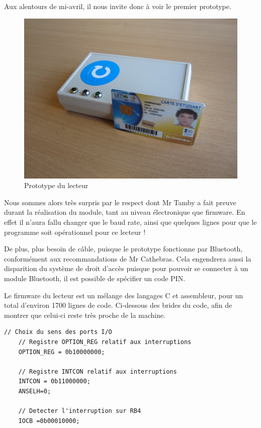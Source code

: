 Aux alentours de mi-avril, il nous invite donc à voir le premier prototype.

    \begin{figure}[h]
        \begin{center}
            \includegraphics[scale=0.75]{images/proto.jpg} 
        \end{center}
        \caption{Prototype du lecteur}
        \label{Prototype du lecteur}
     \end{figure} 

Nous sommes alors très surpris par le respect dont Mr Tamby a fait preuve
durant la réalisation du module, tant au niveau électronique que firmware.
En effet il n'aura fallu changer que le baud rate, ainsi que quelques lignes
pour que le programme soit opérationnel pour ce lecteur !

De plus, plus besoin de câble, puisque le prototype fonctionne par Bluetooth,
conformément aux recommandations de Mr Cathebras. Cela engendrera aussi la disparition
du système de droit d'accès puisque pour pouvoir se connecter à un module Bluetooth,
il est possible de spécifier un code PIN.

Le firmware du lecteur est un mélange des langages C et assembleur, pour un total
d'environ 1700 lignes de code. Ci-dessous des brides du code, afin de montrer
que celui-ci reste très proche de la machine.

    \lstset{language=C}
    \begin{lstlisting} 
// Choix du sens des ports I/O
    // Registre OPTION_REG relatif aux interruptions
    OPTION_REG = 0b10000000;

    // Registre INTCON relatif aux interruptions
    INTCON = 0b11000000;
    ANSELH=0;

    // Detecter l'interruption sur RB4
    IOCB =0b00010000;
    \end{lstlisting}


